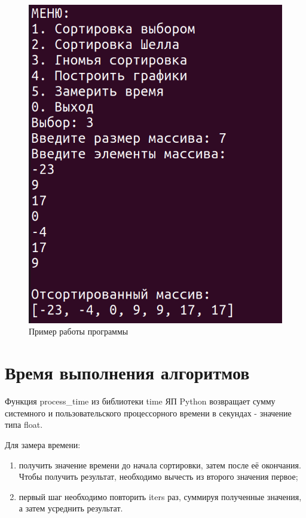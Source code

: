 \begin{figure}[H]
	\begin{center}
		\includegraphics[scale=0.4]{img/example.png}
	\end{center}
	\captionsetup{justification=centering}
	\caption{Пример работы программы}
	\label{img:example}
\end{figure}

\section{Время выполнения алгоритмов}

Функция process\_time из библиотеки time ЯП Python возвращает сумму системного и пользовательского процессорного времени в секундах - значение типа float.

Для замера времени:
\begin{enumerate}
	\item получить значение времени до начала сортировки, затем после её окончания. Чтобы получить результат, необходимо вычесть из второго значения первое;
	\item первый шаг необходимо повторить iters раз, суммируя полученные значения, а затем усреднить результат.
\end{enumerate}


